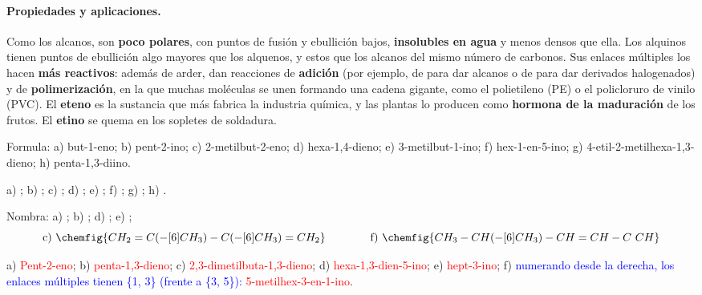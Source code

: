 \paragraph{Propiedades y aplicaciones.} Como los alcanos, son \textbf{poco polares}, con puntos de fusión y ebullición bajos,
\textbf{insolubles en agua} y menos densos que ella. Los alquinos tienen puntos de ebullición algo mayores que los alquenos, y estos
que los alcanos del mismo número de carbonos. Sus enlaces múltiples los hacen \textbf{más reactivos}: además de arder, dan
reacciones de \textbf{adición} (por ejemplo, de  para dar alcanos o de  para dar derivados halogenados) y de
\textbf{polimerización}, en la que muchas moléculas se unen formando una cadena gigante, como el polietileno (PE) o el policloruro de
vinilo (PVC). El \textbf{eteno} es la sustancia que más fabrica la industria química, y las plantas lo producen como
\textbf{hormona de la maduración} de los frutos. El \textbf{etino} se quema en los sopletes de soldadura.

\begin{exercise}
    Formula: a) but-1-eno; b) pent-2-ino; c) 2-metilbut-2-eno; d) hexa-1,4-dieno; e) 3-metilbut-1-ino; f) hex-1-en-5-ino;
    g) 4-etil-2-metilhexa-1,3-dieno; h) penta-1,3-diino.
    \begin{solu}
        a) \textcolor{red}{}; b) \textcolor{red}{};
        c) \textcolor{red}{}; d) \textcolor{red}{};
        e) \textcolor{red}{}; f) \textcolor{red}{};
        g) \textcolor{red}{}; h) \textcolor{red}{}.
    \end{solu}
\end{exercise}

\begin{exercise}
    Nombra: a) ; b) ; d) ;
    e) ;
    \[ \text{c)}\ \chemfig{CH_2=C(-[6]CH_3)-C(-[6]CH_3)=CH_2} \qquad\qquad \text{f)}\ \chemfig{CH_3-CH(-[6]CH_3)-CH=CH-C~CH} \]
    \begin{solu}
        a) \textcolor{red}{Pent-2-eno}; b) \textcolor{red}{penta-1,3-dieno}; c) \textcolor{red}{2,3-dimetilbuta-1,3-dieno};
        d) \textcolor{red}{hexa-1,3-dien-5-ino}; e) \textcolor{red}{hept-3-ino}; f) \textcolor{blue}{numerando desde la derecha,
        los enlaces múltiples tienen \{1, 3\} (frente a \{3, 5\}):} \textcolor{red}{5-metilhex-3-en-1-ino}.
    \end{solu}
\end{exercise}

